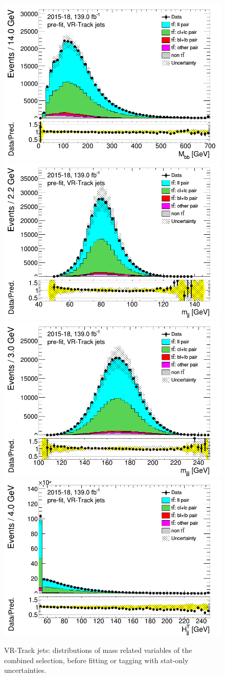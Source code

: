 \documentclass[letterpaper,12pt]{article}
\begin{document}
	\newpage
	\begin{figure}[H]
	\includegraphics[width=.45\textwidth]{FTAG_plots/pretagNoRwwithhighpTVRJetsall/DataMC_h_Mbbtrackjet.png}
	\includegraphics[width=.45\textwidth]{FTAG_plots/pretagNoRwwithhighpTVRJetsall/DataMC_h_mjjtrackjet.png}\\
	\includegraphics[width=.45\textwidth]{FTAG_plots/pretagNoRwwithhighpTVRJetsall/DataMC_h_mjjjtrackjet.png}
	\includegraphics[width=.45\textwidth]{FTAG_plots/pretagNoRwwithhighpTVRJetsall/DataMC_h_Htjjtrackjet.png}\\
	\caption{VR-Track jets: distributions of mass related variables of the combined selection, 
	before fitting or tagging with stat-only uncertainties.} \label{fig:combined_mass_VRJets}
	\end{figure}
	
\end{document}
